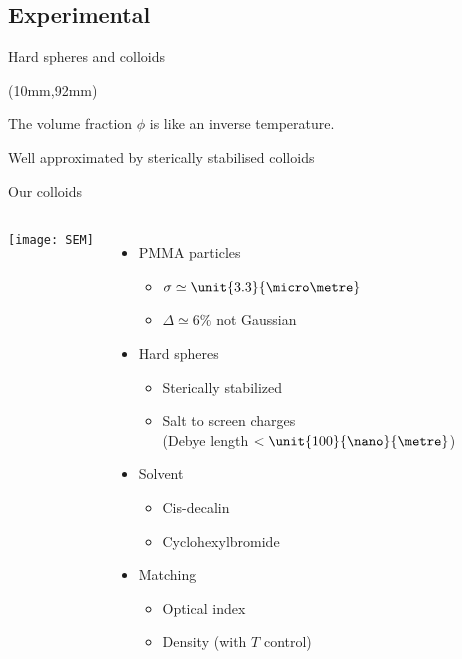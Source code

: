 \subsection{Experimental}

\begin{frame}{Hard spheres and colloids}
	\begin{textblock*}{0.6\textwidth}(10mm,92mm)
		\only<2>{\simplephasediagram{}}%
	\end{textblock*}
	The volume fraction $\phi$ is like an inverse temperature.
	\bigskip
	\def\svgwidth{\textwidth}
	
	\bigskip
	Well approximated by sterically stabilised colloids\\
	\begin{footnotesize}\citep{pusey1986}\end{footnotesize}
\end{frame}

\begin{frame}{Our colloids}
	\begin{columns}
	\centering
	\texttt{[image: SEM]}\\
	\resizebox{\columnwidth}{!}{\begin{huge}\end{huge}}
	\begin{itemize}
		\item PMMA particles 
		\begin{itemize}
			\item $\sigma \simeq \unit{3.3}{\micro\metre}$
			\item $\Delta \simeq 6\%$ not Gaussian
		\end{itemize}
		\item Hard spheres
		\begin{itemize}
			\item Sterically stabilized
			\item Salt to screen charges\\ (Debye length $<\unit{100}{\nano}{\metre}$)
		\end{itemize}
		\item Solvent
		\begin{itemize}
			\item Cis-decalin
			\item Cyclohexylbromide
		\end{itemize}
		\item Matching
		\begin{itemize}
			\item Optical index
			\item Density (with $T$ control)
		\end{itemize}
	\end{itemize}
	\end{columns}
\end{frame}

